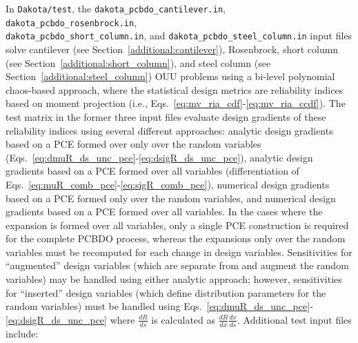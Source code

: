 In \texttt{Dakota/test}, the \texttt{dakota\_pcbdo\_cantilever.in},
\texttt{dakota\_pcbdo\_rosenbrock.in},\\
\texttt{dakota\_pcbdo\_short\_column.in}, and
\texttt{dakota\_pcbdo\_steel\_column.in} input files solve 
cantilever (see Section~\ref{additional:cantilever}), Rosenbrock,
short column (see Section~\ref{additional:short_column}), and steel
column (see Section~\ref{additional:steel_column}) OUU problems using
a bi-level polynomial chaos-based approach, where the statistical
design metrics are reliability indices based on moment projection
(i.e., Eqs.~\ref{eq:mv_ria_cdf}-\ref{eq:mv_ria_ccdf}).  The test
matrix in the former three input files evaluate design gradients of
these reliability indices using several different approaches: analytic
design gradients based on a PCE formed over only over the random
variables (Eqs.~\ref{eq:dmuR_ds_unc_pce}-\ref{eq:dsigR_ds_unc_pce}),
analytic design gradients based on a PCE formed over all variables
(differentiation of
Eqs.~\ref{eq:muR_comb_pce}-\ref{eq:sigR_comb_pce}), numerical design
gradients based on a PCE formed only over the random variables, and
numerical design gradients based on a PCE formed over all variables.
In the cases where the expansion is formed over all variables, only a
single PCE construction is required for the complete PCBDO process,
whereas the expansions only over the random variables must be
recomputed for each change in design variables.  Sensitivities for
``augmented'' design variables (which are separate from and augment
the random variables) may be handled using either analytic approach;
however, sensitivities for ``inserted'' design variables (which define
distribution parameters for the random variables) must be handled
using Eqs.~\ref{eq:dmuR_ds_unc_pce}-\ref{eq:dsigR_ds_unc_pce} where
$\frac{dR}{ds}$ is calculated as $\frac{dR}{dx} \frac{dx}{ds}$.
Additional test input files include:
